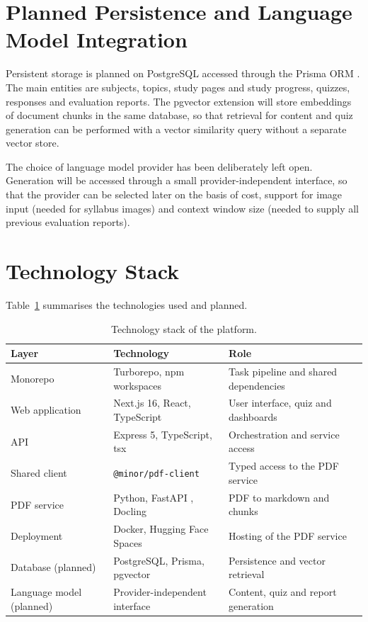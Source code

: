 \documentclass[12pt,a4paper,oneside]{report}
\begin{document}
\section{Planned Persistence and Language Model Integration}

Persistent storage is planned on PostgreSQL accessed through the Prisma
ORM \cite{prisma}. The main entities are subjects, topics, study pages and
study progress, quizzes, responses and evaluation reports. The pgvector
extension will store embeddings of document chunks in the same database,
so that retrieval for content and quiz generation can be performed with a
vector similarity query without a separate vector store.

The choice of language model provider has been deliberately left open.
Generation will be accessed through a small provider-independent
interface, so that the provider can be selected later on the basis of
cost, support for image input (needed for syllabus images) and context
window size (needed to supply all previous evaluation reports).

\section{Technology Stack}

Table~\ref{tab:stack} summarises the technologies used and planned.

\begin{table}[H]
\centering
\caption{Technology stack of the platform.}
\label{tab:stack}
\begin{tabularx}{\textwidth}{@{}llX@{}}
\toprule
\textbf{Layer} & \textbf{Technology} & \textbf{Role} \\
\midrule
Monorepo        & Turborepo, npm workspaces & Task pipeline and shared dependencies \\
Web application & Next.js 16, React, TypeScript & User interface, quiz and dashboards \\
API             & Express 5, TypeScript, tsx & Orchestration and service access \\
Shared client   & \texttt{@minor/pdf-client} & Typed access to the PDF service \\
PDF service     & Python, FastAPI \cite{fastapi}, Docling & PDF to markdown and chunks \\
Deployment      & Docker, Hugging Face Spaces & Hosting of the PDF service \\
Database (planned) & PostgreSQL, Prisma, pgvector & Persistence and vector retrieval \\
Language model (planned) & Provider-independent interface & Content, quiz and report generation \\
\bottomrule
\end{tabularx}
\end{table}
\end{document}
